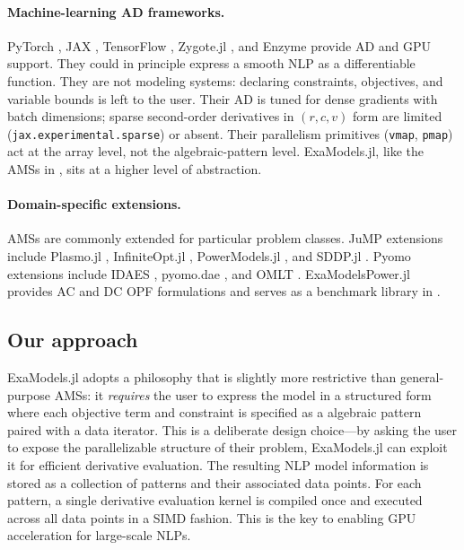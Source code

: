 \documentclass[11pt]{article}
\begin{document}
\paragraph{Machine-learning AD frameworks.}
PyTorch \citep{paszkePyTorchImperativeStyle2019}, JAX \citep{bradburyJAXComposableTransformations2018}, TensorFlow \citep{abadiTensorFlowLargescaleMachine2016}, Zygote.jl \citep{innesDontUnrollAdjoint2018}, and Enzyme \citep{mosesInsteadRewritingForeign2020} provide AD and GPU support. They could in principle express a smooth NLP as a differentiable function. They are not modeling systems: declaring constraints, objectives, and variable bounds is left to the user. Their AD is tuned for dense gradients with batch dimensions; sparse second-order derivatives in $(r, c, v)$ form are limited (\texttt{jax.experimental.sparse}) or absent. Their parallelism primitives (\texttt{vmap}, \texttt{pmap}) act at the array level, not the algebraic-pattern level. ExaModels.jl, like the AMSs in , sits at a higher level of abstraction. 

\paragraph{Domain-specific extensions.}
AMSs are commonly extended for particular problem classes. JuMP extensions include Plasmo.jl \citep{jalvingGraphbasedModelingAbstraction2022}, InfiniteOpt.jl \citep{pulsipherUnifyingModelingAbstraction2022}, PowerModels.jl \citep{coffrinPowerModelsJLOpenSource2018}, and SDDP.jl \citep{dowsonSDDPjlJuliaPackage2021}. Pyomo extensions include IDAES \citep{leeIDAESProcessModeling2021}, pyomo.dae \citep{nicholsonPyomoDAEModeling2018}, and OMLT \citep{cecconOMLTOptimizationMachine2022}. ExaModelsPower.jl \citep{shinExaModelsPowerjl2024} provides AC and DC OPF formulations and serves as a benchmark library in .

\subsection{Our approach}
\label{sec:intro:approach}
ExaModels.jl adopts a philosophy that is slightly more restrictive than general-purpose AMSs: it \emph{requires} the user to express the model in a structured form where each objective term and constraint is specified as a algebraic pattern paired with a data iterator. This is a deliberate design choice---by asking the user to expose the parallelizable structure of their problem, ExaModels.jl can exploit it for efficient derivative evaluation. The resulting NLP model information is stored as a collection of patterns and their associated data points. For each pattern, a single derivative evaluation kernel is compiled once and executed across all data points in a SIMD fashion. This is the key to enabling GPU acceleration for large-scale NLPs. 
\end{document}
